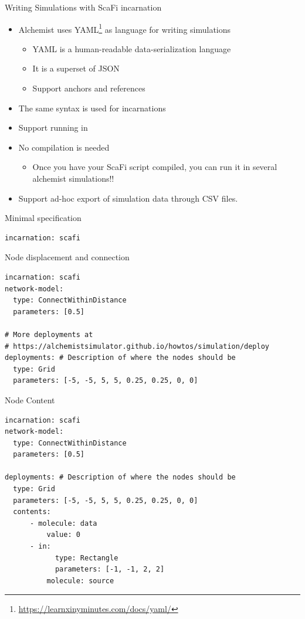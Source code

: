 \documentclass[presentation, 8pt]{beamer}\mode<presentation>{\usetheme{AMSBolognaFC}}
\begin{document}
\begin{frame}{Writing Simulations with ScaFi incarnation}
\begin{itemize}
	\item Alchemist uses YAML\footnote{\url{https://learnxinyminutes.com/docs/yaml/}} as language for writing simulations
	\begin{itemize}
		\item YAML is a human-readable data-serialization language
		\item It is a superset of JSON
		\item Support anchors and references
	\end{itemize}
	\item The same syntax is used for  incarnations
	\item Support running in 
	\item No compilation is needed 
	\begin{itemize}
		\item[\faThumbsUp] Once you have your ScaFi script compiled, you can run it in several alchemist simulations!!
	\end{itemize}
	\item Support ad-hoc export of simulation data through CSV files. 
\end{itemize}
\end{frame}
\begin{frame}[fragile]{Minimal specification}
\begin{verbatim}
incarnation: scafi
\end{verbatim}
\end{frame}
\begin{frame}[fragile]{Node displacement and connection}
\begin{verbatim}
incarnation: scafi
network-model:
  type: ConnectWithinDistance
  parameters: [0.5]

# More deployments at 
# https://alchemistsimulator.github.io/howtos/simulation/deploy
deployments: # Description of where the nodes should be
  type: Grid
  parameters: [-5, -5, 5, 5, 0.25, 0.25, 0, 0]
\end{verbatim}
\end{frame}
\begin{frame}[fragile]{Node Content}
	\begin{verbatim}
incarnation: scafi
network-model:
  type: ConnectWithinDistance
  parameters: [0.5]

deployments: # Description of where the nodes should be
  type: Grid
  parameters: [-5, -5, 5, 5, 0.25, 0.25, 0, 0]
  contents:
	  - molecule: data
		  value: 0
	  - in:
		  	type: Rectangle
		  	parameters: [-1, -1, 2, 2]
		  molecule: source
\end{verbatim}
\end{frame}
\end{document}
